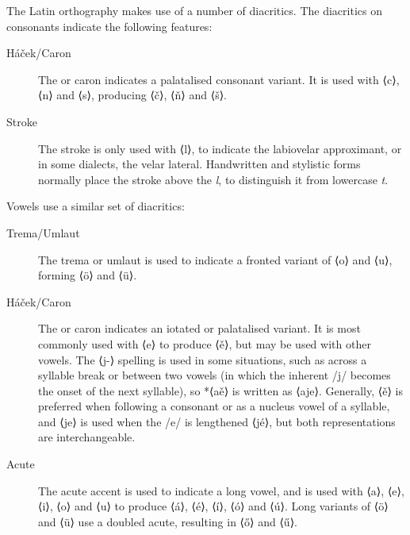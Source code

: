 \documentclass[grammar]{subfiles}
\begin{document}
  \pagebreak[2]
  The Latin orthography makes use of a number of diacritics. The diacritics on consonants indicate the following features:

  \begin{description}
    \item[Háček/Caron] The  or caron indicates a palatalised consonant variant. It is used with ⟨c⟩, ⟨n⟩ and ⟨s⟩, producing ⟨č⟩, ⟨ň⟩ and ⟨š⟩.
    \item[Stroke] The stroke is only used with ⟨l⟩, to indicate the labiovelar approximant, or in some dialects, the velar lateral. Handwritten and stylistic forms normally place the stroke above the \textit l, to distinguish it from lowercase \textit t.
  \end{description}

  \pagebreak[2]
  Vowels use a similar set of diacritics:

  \begin{description}
    \item[Trema/Umlaut] The trema or umlaut is used to indicate a fronted variant of ⟨o⟩ and ⟨u⟩, forming ⟨ö⟩ and ⟨ü⟩.
    \item[Háček/Caron]\label{def:hacek} The  or caron indicates an iotated or palatalised variant. It is most commonly used with ⟨e⟩ to produce ⟨ě⟩, but may be used with other vowels. The ⟨j-⟩ spelling is used in some situations, such as across a syllable break or between two vowels (in which the inherent /j/ becomes the onset of the next syllable), so *⟨aě⟩ is written as ⟨aje⟩. Generally, ⟨ě⟩ is preferred when following a consonant or as a nucleus vowel of a syllable, and ⟨je⟩ is used when the /e/ is lengthened ⟨jé⟩, but both representations are interchangeable.
    \item[Acute] The acute accent is used to indicate a long vowel, and is used with ⟨a⟩, ⟨e⟩, ⟨i⟩, ⟨o⟩ and ⟨u⟩ to produce ⟨á⟩, ⟨é⟩, ⟨í⟩, ⟨ó⟩ and ⟨ú⟩. Long variants of ⟨ö⟩ and ⟨ü⟩ use a doubled acute, resulting in ⟨ő⟩ and ⟨ű⟩. 
  \end{description}
\end{document}

